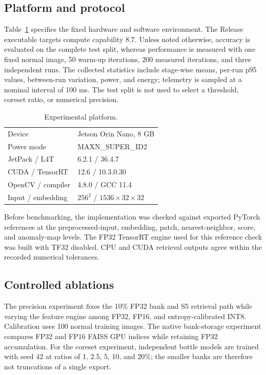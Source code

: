 \documentclass[twocolumn]{svjour3}
\begin{document}
\subsection{Platform and protocol}
Table~\ref{tab:platform} specifies the fixed hardware and software environment.
The Release executable targets compute capability 8.7. Unless noted otherwise,
accuracy is evaluated on the complete test split, whereas performance is
measured with one fixed normal image, 50 warm-up iterations, 200 measured
iterations, and three independent runs. The collected statistics include
stage-wise means, per-run p95 values, between-run variation, power, and energy;
telemetry is sampled at a nominal interval of 100 ms. The test split is not
used to select a threshold, coreset ratio, or numerical precision.

\begin{table}[t]
\caption{Experimental platform.}\label{tab:platform}
\centering\small
\begin{tabular}{ll}\hline
Device & Jetson Orin Nano, 8 GB\\
Power mode & MAXN\_SUPER\_ID2\\
JetPack / L4T & 6.2.1 / 36.4.7\\
CUDA / TensorRT & 12.6 / 10.3.0.30\\
OpenCV / compiler & 4.8.0 / GCC 11.4\\
Input / embedding & $256^2$ / $1536\times32\times32$\\
\hline
\end{tabular}
\end{table}

Before benchmarking, the implementation was checked against exported PyTorch
references at the preprocessed-input, embedding, patch, nearest-neighbor,
score, and anomaly-map levels. The FP32 TensorRT engine used for this reference
check was built with TF32 disabled. CPU and CUDA retrieval outputs agree within
the recorded numerical tolerances.

\subsection{Controlled ablations}
The precision experiment fixes the 10\% FP32 bank and S5 retrieval path while
varying the feature engine among FP32, FP16, and entropy-calibrated INT8.
Calibration uses 100 normal training images. The native bank-storage experiment
compares FP32 and FP16 FAISS GPU indices while retaining FP32 accumulation.
For the coreset experiment, independent bottle models are trained with seed 42
at ratios of 1, 2.5, 5, 10, and 20\%; the smaller banks are therefore not
truncations of a single export.
\end{document}
